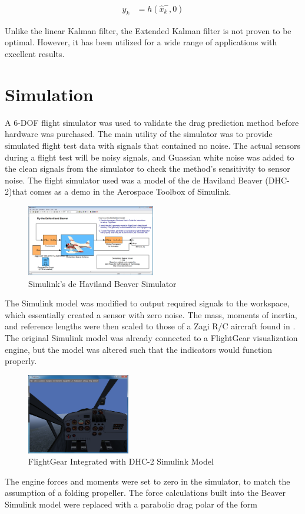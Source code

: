 \documentclass[]{aiaa-tc}%
\begin{document}
\begin{align}
y_k &= h(\hat{x}^-_k,0)
\end{align}

Unlike the linear Kalman filter, the Extended Kalman filter is not proven to be optimal. However, it has been utilized for a wide range of applications with excellent results.
\section{Simulation}
\label{simulation}
A 6-DOF flight simulator was used to validate the drag prediction method before hardware was purchased. The main utility of the simulator was to provide simulated flight test data with signals that contained no noise. The actual sensors during a flight test will be noisy signals, and Guassian white noise was added to the clean signals from the simulator to check the method's sensitivity to sensor noise. The flight simulator used was a model of the de Haviland Beaver (DHC-2)that comes as a demo in the Aerospace Toolbox of Simulink. 
 
\begin{figure}[h]
  \caption{Simulink's de Haviland Beaver Simulator} \label{dhc2Picture}
  \centering
    \includegraphics[width=0.5\textwidth]{figures/dhc2.png}
\end{figure}
The Simulink model was modified to output required signals to the workspace, which essentially created a sensor with zero noise. The mass, moments of inertia, and reference lengths were then scaled to those of a Zagi R/C aircraft found in \cite{stevens2003aircraft}. The original Simulink model was already connected to a FlightGear visualization engine, but the model was altered such that the indicators would function properly.
\begin{figure}[h!]
  \caption{FlightGear Integrated with DHC-2 Simulink Model} \label{flightgearPicture}
  \centering
    \includegraphics[width=0.4\textwidth]{figures/flightgear.png}
\end{figure}
The engine forces and moments were set to zero in the simulator, to match the assumption of a folding propeller.
The force calculations built into the Beaver Simulink model were replaced with a parabolic drag polar of the form
\end{document}

